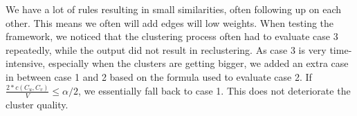 We have a lot of rules resulting in small similarities, often following up on each other. This means we often will add edges will low weights. When testing the framework, we noticed that the clustering process often had to evaluate case 3 repeatedly, while the output did not result in reclustering. As case 3 is very time-intensive, especially when the clusters are getting bigger, we added an extra case in between case 1 and 2 based on the formula used to evaluate case 2. If $\frac{2 * c(C_u,C_v)}{V} \leq \alpha / 2$, we essentially fall back to case 1. This does not deteriorate the cluster quality.

